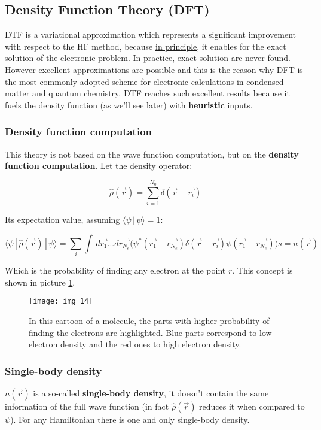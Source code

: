 	\subsection{Density Function Theory (DFT)}
	DTF is a variational approximation which represents a significant improvement with respect to the HF method, because \underline{in principle}, it enables for the exact solution of the electronic problem.
	In practice, exact solution are never found.
	However excellent approximations are possible and this is the reason why DFT is the most commonly adopted scheme for electronic calculations in condensed matter and quantum chemistry.
	DTF reaches such excellent results because it fuels the density function (as we'll see later) with \textbf{heuristic} inputs.

		\subsubsection{Density function computation}
		This theory is not based on the wave function computation, but on the \textbf{density function computation}.
		Let the density operator:

		$$\hat{\rho}(\vec{r})=\sum_{i=1}^{N_0}\delta(\vec{r}-\vec{r_i})$$

		Its expectation value, assuming $\langle \psi\,|\,\psi \rangle =1$:

		$$\langle \psi\,|\,\hat{\rho}(\vec{r})\,|\,\psi \rangle=\sum_i \int\,d\vec{r_1}...d\vec{r_{N_e}}\bigg(\psi^*(\vec{r_1}-\vec{r_{N_e}})\delta(\vec{r}-\vec{r_i})\psi(\vec{r_1}-\vec{r_{N_e}})\bigg)s=n(\vec{r})$$

		Which is the probability of finding any electron at the point $r$.
		This concept is shown in picture \ref{molecule}.

		\begin{figure}[htbp!]
			\centering
			\texttt{[image: img\_14]}
			\caption{In this cartoon of a molecule, the parts with higher probability of finding the electrons are highlighted. Blue parts correspond to low electron density and the red ones to high electron density.}
			\label{molecule}
		\end{figure}

		\subsubsection{Single-body density}
		$n(\vec{r})$ is a so-called \textbf{single-body density}, it doesn't contain the same information of the full wave function (in fact $\hat{\rho}(\vec{r})$ reduces it when compared to $\psi$).
		For any Hamiltonian there is one and only single-body density.\\

